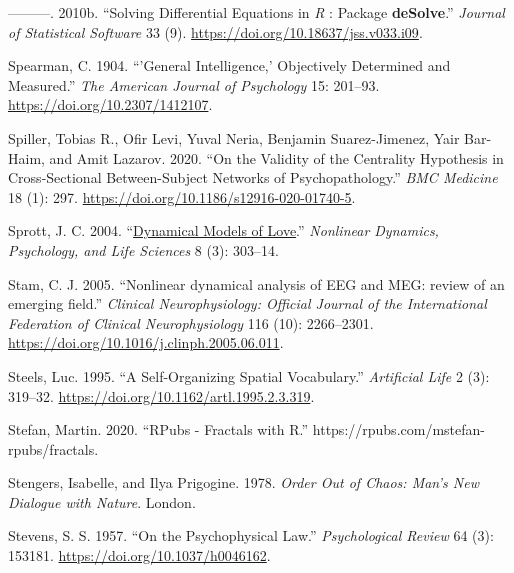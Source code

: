 \documentclass[
  a4paper,
  DIV=11,
  numbers=noendperiod,
  oneside]{scrreprt}
\newlength{\cslhangindent}
\newlength{\cslentryspacingunit} %
\newenvironment{CSLReferences}[2] %
 {%
  \setlength{\parindent}{0pt}
  \ifodd #1
  \let\oldpar\par
  \def\par{\hangindent=\cslhangindent\oldpar}
  \fi
  \setlength{\parskip}{#2\cslentryspacingunit}
 }%
 {}
\begin{document}
\begin{CSLReferences}{1}{0}
\leavevmode{}%
---------. 2010b. {``Solving Differential Equations in {\emph{R}} :
Package {\textbf{deSolve}}.''} \emph{Journal of Statistical Software} 33
(9). \url{https://doi.org/10.18637/jss.v033.i09}.

\leavevmode{}%
Spearman, C. 1904. {``'{General} Intelligence,' Objectively Determined
and Measured.''} \emph{The American Journal of Psychology} 15: 201--93.
\url{https://doi.org/10.2307/1412107}.

\leavevmode{}%
Spiller, Tobias R., Ofir Levi, Yuval Neria, Benjamin Suarez-Jimenez,
Yair Bar-Haim, and Amit Lazarov. 2020. {``On the Validity of the
Centrality Hypothesis in Cross-Sectional Between-Subject Networks of
Psychopathology.''} \emph{BMC Medicine} 18 (1): 297.
\url{https://doi.org/10.1186/s12916-020-01740-5}.

\leavevmode{}%
Sprott, J. C. 2004.
{``\href{https://www.ncbi.nlm.nih.gov/pubmed/15233877}{Dynamical Models
of Love}.''} \emph{Nonlinear Dynamics, Psychology, and Life Sciences} 8
(3): 303--14.

\leavevmode{}%
Stam, C. J. 2005. {``Nonlinear dynamical analysis of EEG and MEG: review
of an emerging field.''} \emph{Clinical Neurophysiology: Official
Journal of the International Federation of Clinical Neurophysiology} 116
(10): 2266--2301. \url{https://doi.org/10.1016/j.clinph.2005.06.011}.

\leavevmode{}%
Steels, Luc. 1995. {``A {Self-Organizing Spatial Vocabulary}.''}
\emph{Artificial Life} 2 (3): 319--32.
\url{https://doi.org/10.1162/artl.1995.2.3.319}.

\leavevmode{}%
Stefan, Martin. 2020. {``{RPubs} - {Fractals} with {R}.''}
https://rpubs.com/mstefan-rpubs/fractals.

\leavevmode{}%
Stengers, Isabelle, and Ilya Prigogine. 1978. \emph{Order {Out} of
{Chaos}: {Man}'s {New Dialogue} with {Nature}}. {London}.

\leavevmode{}%
Stevens, S. S. 1957. {``On the Psychophysical Law.''}
\emph{Psychological Review} 64 (3): 153181.
\url{https://doi.org/10.1037/h0046162}.


\end{CSLReferences}
\end{document}
